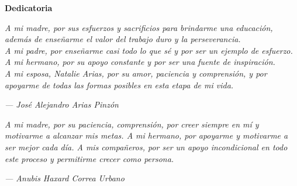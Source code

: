 \cleardoublepage%
%
\thispagestyle{empty}

\vspace*{\fill}

\begin{center}
{\Large\bfseries Dedicatoria}
\end{center}

\vspace{2cm}

\begin{center}
\textit{
    A mi madre, por sus esfuerzos y sacrificios para brindarme una educación, además de enseñarme el valor del trabajo duro y la perseverancia. \\
    A mi padre, por enseñarme casi todo lo que sé y por ser un ejemplo de esfuerzo. \\
    A mi hermano, por su apoyo constante y por ser una fuente de inspiración.\\
    A mi esposa, Natalie Arias, por su amor, paciencia y comprensión, y por apoyarme de todas las formas posibles en esta etapa de mi vida.\\
}

\vspace{2cm}

\hfill \textit{--- José Alejandro Arias Pinzón}

\vspace{3cm}

\textit{
A mi madre, por su paciencia, comprensión, por creer siempre en mí y motivarme
a alcanzar mis metas.
A mi hermano, por apoyarme y motivarme a ser mejor cada día.
A mis compañeros, por ser un apoyo incondicional en todo este proceso y
permitirme crecer como persona.
}

\vspace{2cm}

\hfill \textit{--- Anubis Haxard Correa Urbano}
\end{center}
